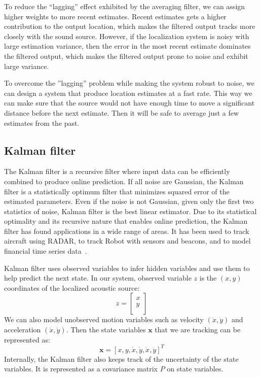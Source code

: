 To reduce the ``lagging'' effect exhibited by the averaging filter, we can assign higher weights to more recent estimates. Recent estimates gets a higher contribution to the output location, which makes the filtered output tracks more closely with the sound source. However, if the localization system is noisy with large estimation variance, then the error in the most recent estimate dominates the filtered output, which makes the filtered output prone to noise and exhibit large variance.

To overcome the ''lagging'' problem while making the system robust to noise, we can design a system that produce location estimates at a fast rate. This way we can make sure that the source would not have enough time to move a significant distance before the next estimate. Then it will be safe to average just a few estimates from the past.

\subsection{Kalman filter}
The Kalman filter is a recursive filter where input data can be efficiently combined to produce online prediction. If all noise are Gaussian, the Kalman filter is a statistically optimum filter that minimizes squared error of the estimated parameters\cite{kalman:1, kalman:3}. Even if the noise is not Gaussian, given only the first two statistics of noise, Kalman filter is the best linear estimator\cite{kalman:2}. Due to its statistical optimality and its recursive nature that enables online prediction, the Kalman filter has found applications in a wide range of areas. It has been used to track aircraft using RADAR, to track Robot with sensors and beacons\cite{kalman:4, kalman:5, kalman:6}, and to model financial time series data~\cite{kalman:7}.

Kalman filter uses observed variables to infer hidden variables and use them to help predict the next state. In our system, observed variable $z$ is the $(x,y)$ coordinates of the localized acoustic source:
\[
z = \left[\begin{array}{c}
x\\
y\\
\end{array}\right]
\]
We can also model unobserved motion variables such as velocity $(\dot{x}, \dot{y})$ and acceleration $(\ddot{x}, \ddot{y})$. Then the state variables $\mathbf{x}$ that we are tracking can be represented as:
\[
\mathbf{x} = \left[x, y, \dot{x}, \dot{y}, \ddot{x}, \ddot{y}\right]^T
\]
Internally, the Kalman filter also keeps track of the uncertainty of the state variables. It is represented as a covariance matrix $P$ on state variables.

